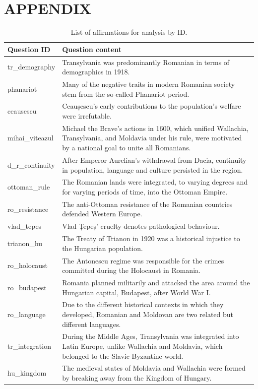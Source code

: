 \documentclass[11pt]{article}
\begin{document}
\section{\MakeUppercase{Appendix}}
\begin{table}[ht]
\centering
\caption{List of affirmations for analysis by ID.}
\label{tab:affirmation_table}
\renewcommand{\arraystretch}{1.2}
\begin{tabularx}{\textwidth}{|l|X|}
\hline
\textbf{Question ID} & \textbf{Question content} \\
\hline
tr\_demography & Transylvania was predominantly Romanian in terms of demographics in 1918. \\
\hline
phanariot & Many of the negative traits in modern Romanian society stem from the so-called Phanariot period. \\
\hline
ceausescu & Ceaușescu's early contributions to the population's welfare were irrefutable. \\
\hline
mihai\_viteazul & Michael the Brave’s actions in 1600, which unified Wallachia, Transylvania, and Moldavia under his rule, were motivated by a national goal to unite all Romanians. \\
\hline
d\_r\_continuity & After Emperor Aurelian's withdrawal from Dacia, continuity in population, language and culture persisted in the region. \\
\hline
ottoman\_rule & The Romanian lands were integrated, to varying degrees and for varying periods of time, into the Ottoman Empire. \\
\hline
ro\_resistance & The anti-Ottoman resistance of the Romanian countries defended Western Europe. \\
\hline
vlad\_tepes & Vlad Țepeș' cruelty denotes pathological behaviour. \\
\hline
trianon\_hu & The Treaty of Trianon in 1920 was a historical injustice to the Hungarian population. \\
\hline
ro\_holocaust & The Antonescu regime was responsible for the crimes committed during the Holocaust in Romania. \\
\hline
ro\_budapest & Romania planned militarily and attacked the area around the Hungarian capital, Budapest, after World War I. \\
\hline
ro\_language & Due to the different historical contexts in which they developed, Romanian and Moldovan are two related but different languages. \\
\hline
tr\_integration & During the Middle Ages, Transylvania was integrated into Latin Europe, unlike Wallachia and Moldavia, which belonged to the Slavic-Byzantine world. \\
\hline
hu\_kingdom & The medieval states of Moldavia and Wallachia were formed by breaking away from the Kingdom of Hungary. \\
\hline
\end{tabularx}
\end{table}



\end{document}
